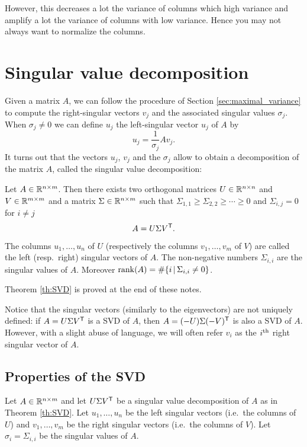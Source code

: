 \documentclass[11pt,nocut]{article}
\begin{document}
However, this decreases a lot the variance of columns which high variance and amplify a lot the variance of columns with low variance. Hence you may not always want to normalize the columns.

\section{Singular value decomposition}

Given a matrix $A$, we can follow the procedure of Section \ref{sec:maximal_variance} to compute the right-singular vectors $v_j$ and the associated singular values $\sigma_j$. When $\sigma_j \neq 0$ we can define $u_j$ the left-singular vector $u_j$ of $A$ by
$$
u_j = \frac{1}{\sigma_j} A v_j.
$$
It turns out that the vectors $u_j$, $v_j$ and the $\sigma_j$ allow to obtain a decomposition of the matrix $A$, called the singular value decomposition:

\begin{theorem}\label{th:SVD}
	Let $A \in \mathbb{R}^{n \times m}$. Then there exists two orthogonal matrices $U \in \mathbb{R}^{n \times n}$ and $V \in \mathbb{R}^{m \times m}$ and a matrix $\Sigma \in \mathbb{R}^{n \times m}$ such that $\Sigma_{1,1} \geq \Sigma_{2,2}  \geq \cdots \geq 0$ and $\Sigma_{i,j} = 0$ for $i\neq j$
	$$
	A = U \Sigma V^{{\sf T}}.
	$$
	The columns $u_1, \dots, u_n$ of $U$ (respectively the columns $v_1, \dots, v_m$ of $V$) are called the left (resp.\ right) singular vectors of $A$. The non-negative numbers $\Sigma_{i,i}$ are the singular values of $A$. Moreover ${{\rm rank}}(A) = \# \{i \, | \, \Sigma_{i,i} \neq 0 \}$.
\end{theorem}
Theorem \ref{th:SVD} is proved at the end of these notes.

Notice that the singular vectors (similarly to the eigenvectors) are not uniquely defined: if $A = U \Sigma V^{{\sf T}}$ is a SVD of $A$, then $A = (-U) \Sigma (-V)^{{\sf T}}$ is also a SVD of $A$. However, with a slight abuse of language, we will often refer $v_i$ as the $i^{\rm th}$ right singular vector of $A$.

\subsection{Properties of the SVD}

Let $A \in \mathbb{R}^{n \times m}$ and let $U \Sigma V^{{\sf T}}$ be a singular value decomposition of $A$ as in Theorem \ref{th:SVD}. Let $u_1, \dots, u_n$ be the left singular vectors (i.e.\ the columns of $U$) and $v_1, \dots, v_m$ be the right singular vectors (i.e.\ the columns of $V$). Let $\sigma_i = \Sigma_{i,i}$ be the singular values of $A$.
\end{document}
